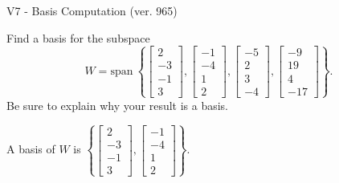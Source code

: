 \begin{exercise}
  \begin{exerciseTitle}V7 - Basis Computation (ver. 965)\end{exerciseTitle}
  \begin{exerciseStatement}
    Find a basis for the subspace 
\[W=\mathrm{span}\ \left\{\left[\begin{array}{r}
2 \\
-3 \\
-1 \\
3
\end{array}\right] , \left[\begin{array}{r}
-1 \\
-4 \\
1 \\
2
\end{array}\right] , \left[\begin{array}{r}
-5 \\
2 \\
3 \\
-4
\end{array}\right] , \left[\begin{array}{r}
-9 \\
19 \\
4 \\
-17
\end{array}\right]\right\}.\]
 Be sure to explain why your result is a basis.


  \end{exerciseStatement}
  \begin{exerciseAnswer}
   A basis of \(W\) is  \(\left\{\left[\begin{array}{r}
2 \\
-3 \\
-1 \\
3
\end{array}\right] , \left[\begin{array}{r}
-1 \\
-4 \\
1 \\
2
\end{array}\right]\right\}\).
  


  \end{exerciseAnswer}
\end{exercise}